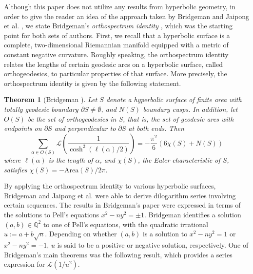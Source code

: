 \documentclass[10pt]{article}
\newtheorem{theorem}{Theorem}
\theoremstyle{definition}
\begin{document}
Although this paper does not utilize any results from hyperbolic geometry, in order to give the reader an idea of the approach taken by Bridgeman \cite{bridgeman2021dilogarithm} and Jaipong et al. \cite{jaipong2023}, we state Bridgeman's \textit{orthospectrum identity} \cite{bridgeman2011orthospectra}, which was the starting point for both sets of authors.  First, we recall that a hyperbolic surface is a complete, two-dimensional Riemannian manifold equipped with a metric of constant negative curvature.  Roughly speaking, the orthospectrum identity relates the lengths of certain geodesic arcs on a hyperbolic surface, called orthogeodesics, to particular properties of that surface.  More precisely, the orthospectrum identity is given by the following statement.
\begin{theorem}[Bridgeman \cite{bridgeman2011orthospectra}]
    Let $S$ denote a hyperbolic surface of finite area with totally geodesic boundary $\partial S \neq \emptyset$, and $N(S)$ boundary cusps.  In addition, let $O(S)$ be the set of orthogeodesics in $S$, that is, the set of geodesic arcs with endpoints on $\partial S$ and perpendicular to $\partial S$ at both ends. Then 
    \begin{equation*}
        \sum_{\alpha \in O(S)}\mathcal{L}\left(\frac{1}{\cosh^2(\ell(\alpha)/2)}\right) = -\frac{\pi^2}{6} \left(6 \chi(S) + N(S)\right)
    \end{equation*}
    where $\ell(\alpha)$ is the length of $\alpha$, and $\chi (S)$, the Euler characteristic of $S$, satisfies $\chi(S) = -\mathrm{Area}(S)/2\pi$.
\end{theorem}
By applying the orthospectrum identity to various hyperbolic surfaces, Bridgeman \cite{bridgeman2021dilogarithm} and Jaipong et al. \cite{jaipong2023} were able to derive dilogarithm series involving certain sequences.  The results in Bridgeman's paper \cite{bridgeman2021dilogarithm} were expressed in terms of the solutions to Pell's equations $x^2-ny^2=\pm 1$.  Bridgeman identifies a solution $(a,b) \in \mathbb{Q}^2$ to one of Pell's equations, with the quadratic irrational $u := a+b\sqrt{n}$.  Depending on whether $(a,b)$ is a solution to $x^2-ny^2= 1$ or $x^2-ny^2=-1$, $u$ is said to be a positive or negative solution, respectively.  One of Bridgeman's main theorems was the following result, which provides a series expression for $\mathcal{L}(1/u^2)$.
\end{document}
